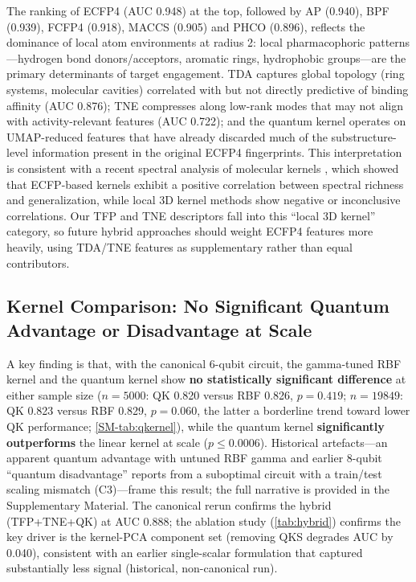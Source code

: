 \documentclass[11pt,a4paper]{article}
\begin{document}
The ranking of ECFP4 (AUC \num{0.948}) at the top, followed by AP (\num{0.940}), BPF (\num{0.939}), FCFP4 (\num{0.918}), MACCS (\num{0.905}) and PHCO (\num{0.896}), reflects the dominance of local atom environments at radius 2: local pharmacophoric patterns---hydrogen bond donors/acceptors, aromatic rings, hydrophobic groups---are the primary determinants of target engagement. TDA captures global topology (ring systems, molecular cavities) correlated with but not directly predictive of binding affinity (AUC \num{0.876}); TNE compresses along low-rank modes that may not align with activity-relevant features (AUC \num{0.722}); and the quantum kernel operates on UMAP-reduced features that have already discarded much of the substructure-level information present in the original ECFP4 fingerprints. This interpretation is consistent with a recent spectral analysis of molecular kernels \citep{jamali2025spectral}, which showed that ECFP-based kernels exhibit a positive correlation between spectral richness and generalization, while local 3D kernel methods show negative or inconclusive correlations. Our TFP and TNE descriptors fall into this ``local 3D kernel'' category, so future hybrid approaches should weight ECFP4 features more heavily, using TDA/TNE features as supplementary rather than equal contributors.

\subsection{Kernel Comparison: No Significant Quantum Advantage or Disadvantage at Scale}

A key finding is that, with the canonical 6-qubit circuit, the gamma-tuned RBF kernel and the quantum kernel show \textbf{no statistically significant difference} at either sample size ($n = \num{5000}$: QK \num{0.820} versus RBF \num{0.826}, $p = \num{0.419}$; $n = \num{19849}$: QK \num{0.823} versus RBF \num{0.829}, $p = \num{0.060}$, the latter a borderline trend toward lower QK performance; \cref{SM-tab:qkernel}), while the quantum kernel \textbf{significantly outperforms} the linear kernel at scale ($p \leq \num{0.0006}$). Historical artefacts---an apparent quantum advantage with untuned RBF gamma and earlier 8-qubit ``quantum disadvantage'' reports from a suboptimal circuit with a train/test scaling mismatch (C3)---frame this result; the full narrative is provided in the Supplementary Material. The canonical rerun confirms the hybrid (TFP+TNE+QK) at AUC \num{0.888}; the ablation study (\cref{tab:hybrid}) confirms the key driver is the kernel-PCA component set (removing QKS degrades AUC by \num{0.040}), consistent with an earlier single-scalar formulation that captured substantially less signal (historical, non-canonical run).
\end{document}
